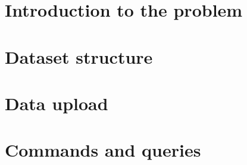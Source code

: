 \chapter{Introduction to the problem}
\label{ch:introduction_to_the_problem_spark}%


\chapter{Dataset structure}
\label{ch:dataset-structure}%


\chapter{Data upload}
\label{ch:data_upload}%


\chapter{Commands and queries}
\label{ch:commands_and_queries}%
